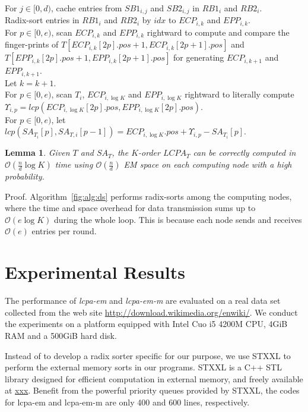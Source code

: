 \documentclass{llncs}
\newtheorem{lem}{Lemma}
\begin{document}
\begin{algorithm}[hbtp!]
{{For $j\in[0,d)$, cache entries from $SB1_{i,j}$ and $SB2_{i,j}$ in $RB1_i$ and $RB2_i$. \\
Radix-sort entries in $RB1_i$ and $RB2_i$ by $idx$ to $ECP_{i,k}$ and $EPP_{i,k}$. \\
For $p\in [0,e)$, scan $ECP_{i,k}$ and $EPP_{i,k}$ rightward to compute and compare the finger-prints of $T[ECP_{i,k}[2p].pos+1, ECP_{i,k}[2p+1].pos]$ and $T[EPP_{i,k}[2p].pos+1, EPP_{i,k}[2p+1].pos]$ for generating $ECP_{i,k+1}$ and $EPP_{i,k+1}$. \\
Let $k=k+1$. \\
}
For $p\in [0,e)$, scan $T_i$, $ECP_{i,\log K}$ and $EPP_{i,\log K}$ rightward to literally compute $\Upsilon_{i,p}=lcp(ECP_{i,\log K}[2p].pos,EPP_{i,\log K}[2p].pos)$. \\
For $p\in [0,e)$, let $lcp(SA_{T_i}[p],SA_{T,i}[p-1])=ECP_{i,\log K}.pos + \Upsilon_{i,p} - SA_{T_i}[p]$. \\
}
\end{algorithm}

\begin{lem}
\label{thm:lcp:pdm}
Given $T$ and $SA_T$, the $K$-order $LCPA_T$ can be correctly computed in $\mathcal{O}(\frac{n}{d}\log K)$ time using $\mathcal{O}(\frac{n}{d})$ EM space on each computing node with a high probability.
\end{lem}
Proof. Algorithm~\ref{fig:alg:ds} performs radix-sorts among the computing nodes, where the time and space overhead for data transmission sums up to $\mathcal{O}(e\log K)$ during the whole loop. This is because each node sends and receives $\mathcal{O}(e)$ entries per round.



\section{Experimental Results}\label{sec:experimental_results}

The performance of {\em lcpa-em} and {\em lcpa-em-m} are evaluated on a real data set collected from the web site \url{http://download.wikimedia.org/enwiki/}. We conduct the experiments on a platform equipped with Intel Cuo i5 4200M CPU, 4GiB RAM and a 500GiB hard disk.

Instead of to develop a radix sorter specific for our purpose, we use  {STXXL}\cite{Dementiev2007} to perform the external memory sorts in our programs. {STXXL} is a {C++} {STL} library designed for efficient computation in external memory, and freely available at \url{xxx}. Benefit from the powerful priority queues provided by {STXXL}, the codes for {lcpa-em} and {lcpa-em-m} are only 400 and 600 lines, respectively.
\end{document}
